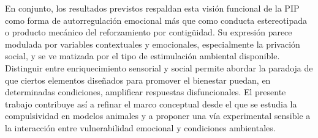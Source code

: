 \documentclass[12pt,a4paper]{article}
\begin{document}
\begin{multicols}{2}
En conjunto, los resultados previstos respaldan esta visión funcional de la PIP como forma de autorregulación emocional más que como conducta estereotipada o producto mecánico del reforzamiento por contigüidad. Su expresión parece modulada por variables contextuales y emocionales, especialmente la privación social, y se ve matizada por el tipo de estimulación ambiental disponible. Distinguir entre enriquecimiento sensorial y social permite abordar la paradoja de que ciertos elementos diseñados para promover el bienestar puedan, en determinadas condiciones, amplificar respuestas disfuncionales. El presente trabajo contribuye así a refinar el marco conceptual desde el que se estudia la compulsividad en modelos animales y a proponer una vía experimental sensible a la interacción entre vulnerabilidad emocional y condiciones ambientales.





\end{multicols}
\end{document}
